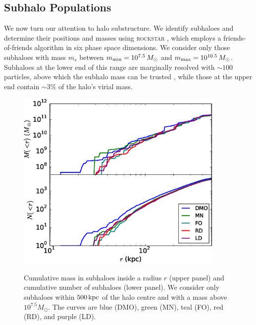 \subsection{Subhalo Populations}

We now turn our attention to halo substructure.  We identify subhaloes
and determine their positions and masses using \textsc{rockstar}
\citep{rockstar}, which employs a friends-of-friends algorithm in six
phase space dimensions.  We consider only those subhaloes with mass
$m_s$ between $m_{\rm min} = 10^{7.5}\,M_\odot$ and $m_{\rm max} =
10^{10.5}\,M_\odot$.  Subhaloes at the lower end of this range are
marginally resolved with $\sim100$ particles, above which the subhalo
mass can be trusted \citep[e.g.][]{onions_et_al_2012}, while those at the upper end contain $\sim 3\%$ of
the halo's virial mass.

\begin{figure} 
\centering 
{\includegraphics[width=0.9\textwidth]{../figures/cumulative_radial_distribution_five_sims.eps}}
\caption{Cumulative mass in subhaloes inside a radius $r$ (upper panel)
  and cumulative number of subhaloes (lower panel).  We consider only
  subhaloes within $500\,{\rm kpc}$ of the halo centre and with a mass
  above $10^{7.5} M_\odot$.  The curves are blue (DMO), green (MN),
  teal (FO), red (RD), and purple (LD).}
\label{fig:cumulative_distributions}
\end{figure}

